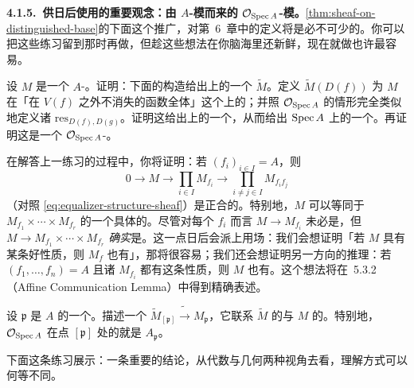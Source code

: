 \textbf{4.1.5.\ 供日后使用的重要观念：由 $A$-模而来的 $\mathcal{O}_{\operatorname{Spec} A}$-模。}\quad \cref{thm:sheaf-on-distinguished-base}的下面这个推广，对第~6~章中\trQCSheaf{}的定义将是必不可少的。你可以把这些练习留到那时再做，但趁这些想法在你脑海里还新鲜，现在就做也许最容易。

\begin{exercise}[重要练习兼定义]\label{ex:module-sheaf-on-base}
设 $M$ 是一个 $A$-\trModule。证明：下面的构造给出\trDistinguishedBase{}上的一个\trSheaf{} $\widetilde{M}$。定义 $\widetilde{M}(D(f))$ 为 $M$ 在「在 $V(f)$ 之外不消失的函数全体」这个\trMultiplicativeSubset{}上的\trLocalization；并照 $\mathcal{O}_{\operatorname{Spec} A}$ 的情形完全类似地定义诸\trRestrictionMap{} $\mathrm{res}_{D(f),D(g)}$。证明这给出\trDistinguishedBase{}上的一个\trSheaf，从而给出 $\operatorname{Spec} A$ 上的一个\trSheaf。再证明这是一个 $\mathcal{O}_{\operatorname{Spec} A}$-\trModule。
\end{exercise}

\begin{remark}[重要注记]\label{thm:module-equalizer-exactness}
在解答上一练习的过程中，你将证明：若 $(f_i)_{i\in I}=A$，则
\begin{equation*}\tag{4.1.6.1}\label{eq:module-equalizer-sequence}
0\longrightarrow M\longrightarrow\prod_{i\in I}M_{f_i}\longrightarrow\prod_{i\neq j\in I}M_{f_i f_j}
\end{equation*}
（对照 \eqref{eq:equalizer-structure-sheaf}）是正合的。特别地，$M$ 可以等同于 $M_{f_1}\times\cdots\times M_{f_r}$ 的一个具体的\trSubmodule。尽管对每个 $f_i$ 而言 $M\to M_{f_i}$ 未必是\trInclusionMap，但 $M\to M_{f_1}\times\cdots\times M_{f_r}$ \emph{确实}是\trInclusionMap。这一点日后会派上用场：我们会想证明「若 $M$ 具有某条好性质，则 $M_f$ 也有」，那将很容易；我们还会想证明另一方向的推理：若 $(f_1,\dots,f_n)=A$ 且诸 $M_{f_i}$ 都有这条性质，则 $M$ 也有。这个想法将在\trAffineCommunicationLemma{}~5.3.2（Affine Communication Lemma）中得到精确表述。
\end{remark}

\begin{exercise}\label{ex:stalk-tilde-m-localization}
设 $\mathfrak{p}$ 是 $A$ 的一个\trPrimeIdeal。描述一个\trCanonical\trIsomorphism{} $\widetilde{M}_{[\mathfrak{p}]}\tilde{\longrightarrow}M_{\mathfrak{p}}$，它联系 $\widetilde{M}$ 的\trStalk{}与 $M$ 的\trLocalization。特别地，$\mathcal{O}_{\operatorname{Spec} A}$ 在点 $[\mathfrak{p}]$ 处的\trStalk{}就是\trLocalRing{} $A_{\mathfrak{p}}$。
\end{exercise}

下面这条练习展示：一条重要的结论，从代数与几何两种视角去看，理解方式可以何等不同。

